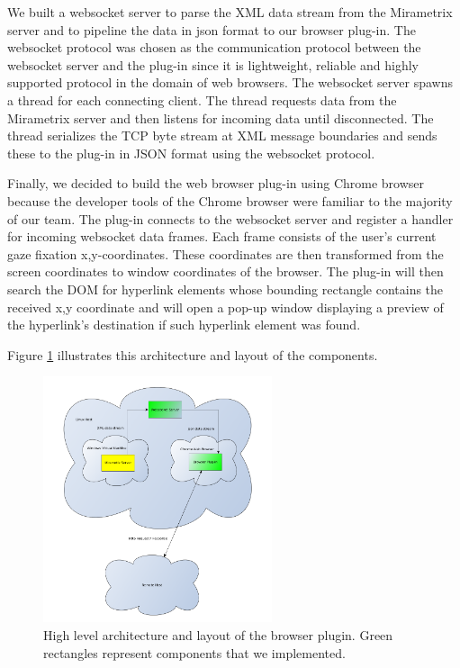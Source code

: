 \documentclass[english]{tktltiki}
\begin{document}
We built a websocket server to parse the XML data stream from the Mirametrix server and to pipeline the data in json format to our browser plug-in. The websocket protocol was chosen as the communication protocol between the websocket server and the plug-in since it is lightweight, reliable and highly supported protocol in the domain of web browsers. The websocket server spawns a thread for each connecting client. The thread requests data from the Mirametrix server and then listens for incoming data until disconnected. The thread serializes the TCP byte stream at XML message boundaries and sends these to the plug-in in JSON format using the websocket protocol.  

Finally, we decided to build the web browser plug-in using Chrome browser because the developer tools of the Chrome browser were familiar to the majority of our team. The plug-in connects to the websocket server and register a handler for incoming websocket data frames. Each frame consists of the user's current gaze fixation x,y-coordinates. These coordinates are then transformed from the screen coordinates to window coordinates of the browser. The plug-in will then search the DOM for hyperlink elements whose bounding rectangle contains the received x,y coordinate and will open a pop-up window displaying a preview of the hyperlink's destination if such hyperlink element was found.

Figure \ref{pluginarchitecture} illustrates this architecture and layout of the components.

\begin{figure}[h]
\begin{center}
\includegraphics[width=0.6\textwidth]{plugin_architecture.png}
\caption{High level architecture and layout of the browser plugin. Green rectangles represent components that we implemented.}
\label{pluginarchitecture}
\end{center}
\end{figure}
\end{document}
